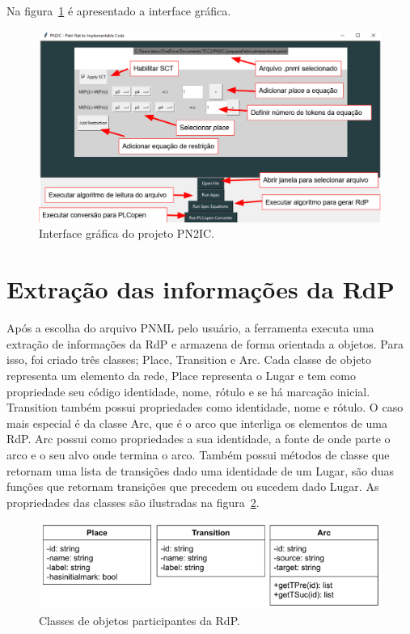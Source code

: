 Na figura~\ref{fig:interfacegrafica} \'e apresentado a interface gr\'afica.

\begin{figure}[!htb]
	\caption[Interface gr\'afica do projeto PN2IC.]{Interface gr\'afica do projeto PN2IC.}
	\label{fig:interfacegrafica}
	\includegraphics[width=16cm]{./figuras/INTERFACE_GRAFICA_PN2IC.png}\centering
\end{figure}

\section{Extra\c{c}\~ao das informa\c{c}\~oes da RdP}
Ap\'os a escolha do arquivo PNML pelo usu\'ario, a ferramenta executa uma extra\c{c}\~ao de informa\c{c}\~oes da RdP e armazena de forma orientada a objetos. Para isso, foi criado tr\^es classes; Place, Transition e Arc. Cada classe de objeto representa um elemento da rede, Place representa o Lugar e tem como propriedade seu c\'odigo identidade, nome, r\'otulo e se h\'a marca\c{c}\~ao inicial. Transition tamb\'em possui propriedades como identidade, nome e r\'otulo.
O caso mais especial \'e da classe Arc, que \'e o arco que interliga os elementos de uma RdP. Arc possui como propriedades a sua identidade, a fonte de onde parte o arco e o seu alvo onde termina o arco. Tamb\'em possui m\'etodos de classe que retornam uma lista de transi\c{c}\~oes dado uma identidade de um Lugar, s\~ao duas fun\c{c}\~oes que retornam transi\c{c}\~oes que precedem ou sucedem dado Lugar. As propriedades das classes s\~ao ilustradas na figura~\ref{fig:classes}.


\begin{figure}[!htb]
	\caption[Classes de objetos participantes da RdP.]{Classes de objetos participantes da RdP.}
	\label{fig:classes}
	\includegraphics[width=16cm]{./figuras/CLASSES.png}\centering
\end{figure}

